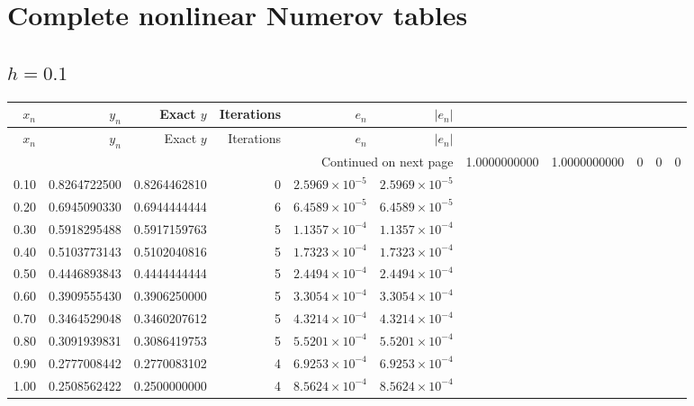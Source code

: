 \documentclass[11pt,a4paper]{article}
\begin{document}
\section{Complete nonlinear Numerov tables}
\subsection{\texorpdfstring{$h=0.1$}{h=0.1}}
\begingroup\footnotesize\setlength{\tabcolsep}{5pt}
\begin{longtable}{rrrrrr}
\toprule $x_n$ & $y_n$ & Exact $y$ & Iterations & $e_n$ & $|e_n|$ \\ \midrule
\endfirsthead
\toprule $x_n$ & $y_n$ & Exact $y$ & Iterations & $e_n$ & $|e_n|$ \\ \midrule
\endhead\midrule\multicolumn{6}{r}{Continued on next page}\endfoot\bottomrule\endlastfoot
0.00 & 1.0000000000 & 1.0000000000 & 0 & $0$ & $0$ \\
0.10 & 0.8264722500 & 0.8264462810 & 0 & $2.5969\times 10^{-5}$ & $2.5969\times 10^{-5}$ \\
0.20 & 0.6945090330 & 0.6944444444 & 6 & $6.4589\times 10^{-5}$ & $6.4589\times 10^{-5}$ \\
0.30 & 0.5918295488 & 0.5917159763 & 5 & $1.1357\times 10^{-4}$ & $1.1357\times 10^{-4}$ \\
0.40 & 0.5103773143 & 0.5102040816 & 5 & $1.7323\times 10^{-4}$ & $1.7323\times 10^{-4}$ \\
0.50 & 0.4446893843 & 0.4444444444 & 5 & $2.4494\times 10^{-4}$ & $2.4494\times 10^{-4}$ \\
0.60 & 0.3909555430 & 0.3906250000 & 5 & $3.3054\times 10^{-4}$ & $3.3054\times 10^{-4}$ \\
0.70 & 0.3464529048 & 0.3460207612 & 5 & $4.3214\times 10^{-4}$ & $4.3214\times 10^{-4}$ \\
0.80 & 0.3091939831 & 0.3086419753 & 5 & $5.5201\times 10^{-4}$ & $5.5201\times 10^{-4}$ \\
0.90 & 0.2777008442 & 0.2770083102 & 4 & $6.9253\times 10^{-4}$ & $6.9253\times 10^{-4}$ \\
1.00 & 0.2508562422 & 0.2500000000 & 4 & $8.5624\times 10^{-4}$ & $8.5624\times 10^{-4}$ \\
\end{longtable}
\endgroup
\end{document}
